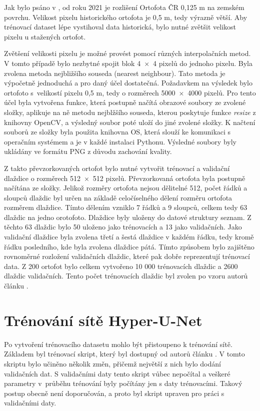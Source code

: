 Jak bylo psáno v , od roku 2021 je rozlišení Ortofota ČR 0,125 m na zemském povrchu. Velikost pixelu historického ortofota je 0,5 m, tedy výrazně větší. Aby trénovací dataset lépe vystihoval data historická, bylo nutné zvětšit velikost pixelu u stažených ortofot.

Zvětšení velikosti pixelu je možné provést pomocí různých interpolačních metod. V tomto případě bylo nezbytné spojit blok 4~$\times$~4 pixelů do jednoho pixelu. Byla zvolena metoda nejbližšího souseda (nearest neighbour). Tato metoda je výpočetně jednoduchá a pro daný účel dostatečná. Požadavkem na výsledek bylo ortofoto s~velikostí pixelu 0,5 m, tedy o rozměrech 5000~$\times$~4000 pixelů. Pro tento účel byla vytvořena funkce, která postupně načítá obrazové soubory ze zvolené složky, aplikuje na ně metodu nejblžšího souseda, kterou poskytuje funkce \textit{resize} z knihovny OpenCV, a výsledný soubor poté uloží do jiné zvolené složky. K načtení souborů ze složky byla použita knihovna OS, která slouží ke komunikaci s operačním systémem a je v každé instalaci Pythonu. Výsledné soubory byly ukládány ve formátu PNG z důvodu zachování kvality.

Z takto převzorkovaných ortofot bylo nutné vytvořit trénovací a validační dlaždice o rozměrech 512~$\times$~512 pixelů. Převzorkovaná ortofota byla postupně načítána ze složky. Jelikož rozměry ortofota nejsou dělitelné 512, počet řádků a sloupců dlaždic byl určen na základě celočíselného dělení rozměru ortofota rozměrem dlaždice. Tímto dělením vzniklo 7 řádků a 9 sloupců, celkem tedy 63 dlaždic na jedno orotofoto. Dlaždice byly uloženy do datové struktury seznam. Z těchto 63 dlaždic bylo 50 uloženo jako trénovacích a 13 jako validačních. Jako validační dlaždice byla zvolena třetí a šestá dlaždice v každém řádku, tedy kromě řádku posledního, kde byla zvolena dlaždice pátá. Tímto způsobem bylo zajištěno rovnoměrné rozložení validačních dlaždic, které pak dobře reprezentují trénovací data. Z 200 ortofot bylo celkem vytvořeno 10 000 trénovacích dlaždic a 2600 dlaždic validačních. Tento počet trénovacích dlaždic byl zvolen po vzoru autorů článku \cite{farella}.

\section{Trénování sítě Hyper-U-Net}

Po vytvoření trénovacího datasetu mohlo být přistoupeno k trénování sítě. Základem byl trénovací skript, který byl dostupný od autorů článku \cite{farella}. V tomto skriptu bylo učiněno několik změn, přičemž největší z nich bylo dodání validačních dat. S validačními daty tento skript vůbec nepočítal a veškeré parametry v~průběhu trénování byly počítány jen s daty trénovacími. Takový postup obecně není doporučován, a proto byl skript upraven pro práci s validačními daty.

